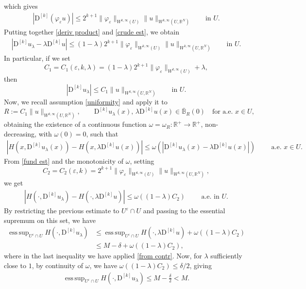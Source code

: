 \documentclass[a4paper,11pt]{article}
\numberwithin{equation}{section}
\newcommand{\numberset}{\mathbb}
\newcommand{\eps}{\varepsilon}
\newcommand{\R}{\numberset{R}}
\DeclareMathOperator*{\esssup}{ess\,sup}
\theoremstyle{definition}
\begin{document}
which gives
\begin{align}\label{crude est}
|\mathrm D^{[k]}(\varphi_\eps u)|\leq 2^{k+1}\|\varphi_\eps\|_{W^{k,\infty}(U)}\|u\|_{W^{k,\infty}(U,\R^N)}\qquad \mbox{in }U.
\end{align}
Putting together \eqref{deriv product} and \eqref{crude est}, we obtain
\begin{align}\label{fund est}
|\mathrm D^{[k]}u_\lambda-\lambda \mathrm D^{[k]}u|\leq(1-\lambda)2^{k+1}\|\varphi_\eps\|_{W^{k,\infty}(U)}\|u\|_{W^{k,\infty}(U,\R^N)}\qquad\mbox{in }U.
\end{align}
In particular, if we set 
$$C_1=C_1(\eps,k,\lambda)=(1-\lambda)2^{k+1}\|\varphi_\eps\|_{W^{k,\infty}(U)}+\lambda,$$
then
$$
|\mathrm D^{[k]}u_\lambda|\leq C_1\|u\|_{W^{k,\infty}(U,\R^N)}\qquad\mbox{in }U.
$$
Now, we recall assumption \eqref{uniformity} and apply it to $$R:=C_1\|u\|_{W^{k,\infty}(U,\R^N)}, \qquad\mathrm D^{[k]}u_\lambda(x),\,\lambda\mathrm D^{[k]}u(x)\in \overline{\mathbb B}_R(0)\quad\mbox{for a.e.   }x\in U,$$
obtaining the existence of a continuous function $\omega=\omega_R:\R^+\to\R^+$, non-decreasing, with $\omega(0)=0$, such that
\begin{align*}
|H(x,\mathrm D^{[k]}u_\lambda(x))-H(x,\lambda\mathrm D^{[k]}u(x))|\leq \omega(|\mathrm D^{[k]}u_\lambda(x)-\lambda\mathrm D^{[k]}u(x)|)\qquad\mbox{ a.e. }x\in U.
\end{align*} 
From \eqref{fund est} and the monotonicity of $\omega$, setting
$$
C_2=C_2(\eps,k)=2^{k+1}\|\varphi_\eps\|_{W^{k,\infty}(U)}\|u\|_{W^{k,\infty}(U,\R^N)},
$$
we get
\begin{align*}
|H(\cdot,\mathrm D^{[k]}u_\lambda)-H(\cdot,\lambda\mathrm D^{[k]}u)|\leq \omega\left((1-\lambda)C_2\right)\qquad\mbox{ a.e. in } U.
\end{align*}
By restricting the previous estimate to $U^\eps\cap U$ and passing to the essential supremum on this set, we have
\begin{align*}
\esssup_{U^\eps\cap U}H(\cdot, \mathrm D^{[k]}u_\lambda)&\leq\esssup_{U^\eps\cap U}H(\cdot, \lambda\mathrm D^{[k]}u)+ \omega\left((1-\lambda)C_2\right)\\
&\leq M-\delta +\omega\left((1-\lambda)C_2\right),
\end{align*}
where in the last inequality we have applied \eqref{from contr}. Now, for $\lambda$ sufficiently close to $1$, by continuity of $\omega$, we have $\omega\left((1-\lambda)C_2\right)\leq\delta/2$, giving
\begin{align}\label{first key}
\esssup_{U^\eps\cap U}H(\cdot, \mathrm D^{[k]}u_\lambda)\leq M-\frac{\delta}{2}<M.
\end{align}
\end{document}
